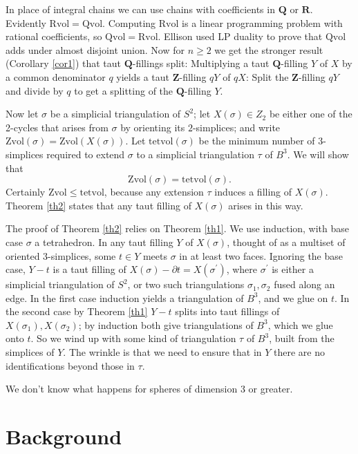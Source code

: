 \documentclass[12pt]{article}
\def\ZZ{\mathbf{Z}}
\def\QQ{\mathbf{Q}}
\def\RR{\mathbf{R}}
\def\del{\partial}
\newcommand{\kw}{\mathrm}
\newcommand{\Zvol}{\kw{Zvol}}
\newcommand{\Qvol}{\kw{Qvol}}
\newcommand{\Rvol}{\kw{Rvol}}
\newcommand{\tetvol}{\kw{tetvol}}
\begin{document}
In place of integral chains we can use chains with
coefficients in $\QQ$ or $\RR$.
Evidently $\Rvol=\Qvol$.
Computing $\Rvol$ is a linear programming problem with rational coefficients,
so $\Qvol = \Rvol$.
Ellison used LP duality to prove that
$\Qvol$ adds under almost
disjoint union.
Now for $n \geq 2$ we get the stronger result
(Corollary \ref{cor1})
that taut $\QQ$-fillings split:
Multiplying a taut
$\QQ$-filling $Y$ of $X$ by a common denominator $q$
yields a taut $\ZZ$-filling $qY$ of $qX$:
Split the $\ZZ$-filling $qY$ and divide by $q$ to get a splitting
of the $\QQ$-filling $Y$.

Now let $\sigma$ be a simplicial triangulation of $S^2$;
let $X(\sigma) \in Z_2$ be either one of the 2-cycles
that arises from $\sigma$ by orienting its $2$-simplices;
and write $\Zvol(\sigma) = \Zvol(X(\sigma))$.
Let $\tetvol(\sigma)$ be the minimum number of $3$-simplices
required to extend $\sigma$ to a simplicial triangulation $\tau$ of $B^3$.
We will show that
\[
\Zvol(\sigma) = \tetvol(\sigma)
.
\]
Certainly $\Zvol \leq \tetvol$, because any extension $\tau$ induces a filling
of $X(\sigma)$.
Theorem \ref{th2} states that 
any taut filling of $X(\sigma)$ arises in this way.

The proof of Theorem \ref{th2} relies on Theorem \ref{th1}.
We use induction, with base case $\sigma$ a tetrahedron.
In any taut filling $Y$ of $X(\sigma)$,
thought of as a multiset of oriented $3$-simplices,
some $t \in Y$ meets $\sigma$ in at least two faces.
Ignoring the base case,
$Y-t$ is a taut filling of
$X(\sigma) - \del t = X(\sigma^\prime)$,
where $\sigma^\prime$ is either a simplicial triangulation of $S^2$,
or two such triangulations $\sigma_1,\sigma_2$ fused along an edge.
In the first case induction yields a triangulation of $B^3$,
and we glue on $t$.
In the second case by Theorem \ref{th1}
$Y-t$ splits into taut fillings of $X(\sigma_1),X(\sigma_2)$;
by induction both give triangulations of $B^3$, which we
glue onto $t$.
So we wind up with some kind of triangulation $\tau$ of $B^3$,
built from the simplices of $Y$.
The wrinkle is that we need to ensure that in $Y$ there are no
identifications beyond those in $\tau$.

We don't know what happens for spheres of dimension 3 or greater.

\section{Background}
\end{document}

